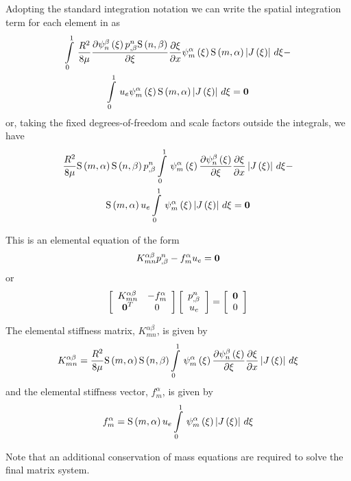 Adopting the standard integration notation we can write the spatial
integration term for each element in  as
\begin{multline}
  \gint{0}{1}{\frac{R^{2}}{8\mu}\delby{\gbfn{n}{\beta}{\xi}\nodedof{p}{n}{\beta}\gsf{n}{\beta}}{\xi}
    \delby{\xi}{x}\gbfn{m}{\alpha}{\xi}\gsf{m}{\alpha}\abs{\fnof{J}{\xi}}}{\xi}- \\
  \gint{0}{1}{\elementdof{u}{e}\gbfn{m}{\alpha}{\xi}\gsf{m}{\alpha}\abs{\fnof{J}{\xi}}}{\xi}=\vect{0}
  \label{eqn:Poiseullefemform1}
\end{multline}
or, taking the fixed degrees-of-freedom and scale factors outside the integrals, we have
\begin{multline}
  \frac{R^{2}}{8\mu}\gsf{m}{\alpha}\gsf{n}{\beta}\nodedof{p}{n}{\beta}\gint{0}{1}{\gbfn{m}{\alpha}{\xi}
    \delby{\gbfn{n}{\beta}{\xi}}{\xi}\delby{\xi}{x}\abs{\fnof{J}{\xi}}}{\xi}- \\
  \gsf{m}{\alpha}\elementdof{u}{e}\gint{0}{1}{\gbfn{m}{\alpha}{\xi}\abs{\fnof{J}{\xi}}}{\xi}=\vect{0}
  \label{eqn:Poiseullefemform2}
\end{multline}

This is an elemental equation of the form
\begin{equation}
  K^{\alpha\beta}_{mn}\nodedof{p}{n}{\beta}-f^{\alpha}_{m}\elementdof{u}{e}=\vect{0}
\end{equation}
or
\begin{equation}
  \left[ \begin{array}{cc}
      K^{\alpha\beta}_{mn} & -f^{\alpha}_{m} \\
      \transpose{\vect{0}} & 0
    \end{array} \right] \left[ \begin{array}{c}
      \nodedof{p}{n}{\beta} \\
      \elementdof{u}{e}
    \end{array} \right] =  \left[ \begin{array}{c}
      \vect{0} \\
      0
    \end{array} \right]
\end{equation}

The elemental stiffness matrix, $K^{\alpha\beta}_{mn}$, is given by
\begin{equation}
  K^{\alpha\beta}_{mn}=\frac{R^{2}}{8\mu}   \mathrm{S} \left( m,\alpha \right)     \mathrm{S} \left( n,\beta \right)  
    \displaystyle\int\limits_{0}^{1} \,   \psi_{m}^{\alpha} \left( \xi \right)   \dfrac{\partial    \psi_{n}^{\beta} \left( \xi \right)  }{\partial \xi}  \dfrac{\partial \xi}{\partial x} 
    \left|  J\left( \xi \right)  \right|\,d\xi 
  \label{eqn:elementalfemlhs1}
\end{equation}
and the elemental stiffness vector, $f^{\alpha}_{m}$, is given by
\begin{equation}
  f^{\alpha}_{m}=   \mathrm{S} \left( m,\alpha \right)   u_{e}   \displaystyle\int\limits_{0}^{1} \,   \psi_{m}^{\alpha} \left( \xi \right)  
    \left|  J\left( \xi \right)  \right|\,d\xi 
  \label{eqn:elementalfemlhs2}
\end{equation}

Note that an additional conservation of mass equations are required to solve
the final matrix system.
